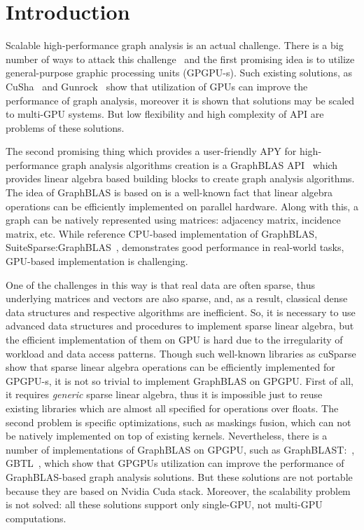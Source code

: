 \section{Introduction}

Scalable high-performance graph analysis is an actual challenge.
There is a big number of ways to attack this challenge~\cite{Coimbra2021} and the first promising idea is to utilize general-purpose graphic processing units (GPGPU-s).
Such existing solutions, as CuSha~\cite{10.1145/2600212.2600227} and Gunrock~\cite{7967137} show that utilization of GPUs can improve the performance of graph analysis, moreover it is shown that solutions may be scaled to multi-GPU systems.
But low flexibility and high complexity of API are problems of these solutions.

The second promising thing which provides a user-friendly APY for high-performance graph analysis algorithms creation is a GraphBLAS API~\cite{7761646} which provides linear algebra based building blocks to create graph analysis algorithms.
The idea of GraphBLAS is based on is a well-known fact that linear algebra operations can be efficiently implemented on parallel hardware.
Along with this, a graph can be natively represented using matrices: adjacency matrix, incidence matrix, etc.
While reference CPU-based implementation of GraphBLAS, SuiteSparse:GraphBLAS~\cite{10.1145/3322125}, demonstrates good performance in real-world tasks, GPU-based implementation is challenging.

One of the challenges in this way is that real data are often sparse, thus underlying matrices and vectors are also sparse, and, as a result, classical dense data structures and respective algorithms are inefficient. 
So, it is necessary to use advanced data structures and procedures to implement sparse linear algebra, but the efficient implementation of them on GPU is hard due to the irregularity of workload and data access patterns.
Though such well-known libraries as cuSparse show that sparse linear algebra operations can be efficiently implemented for GPGPU-s, it is not so trivial to implement GraphBLAS on GPGPU. 
First of all, it requires \textit{generic} sparse linear algebra, thus it is impossible just to reuse existing libraries which are almost all specified for operations over floats.
The second problem is specific optimizations, such as maskings fusion, which can not be natively implemented on top of existing kernels.
Nevertheless, there is a number of implementations of GraphBLAS on GPGPU, such as GraphBLAST:~\cite{yang2019graphblast}, GBTL~\cite{7529957}, which show that GPGPUs utilization can improve the performance of GraphBLAS-based graph analysis solutions.
But these solutions are not portable because they are based on Nvidia Cuda stack.
Moreover, the scalability problem is not solved: all these solutions support only single-GPU, not multi-GPU computations.

